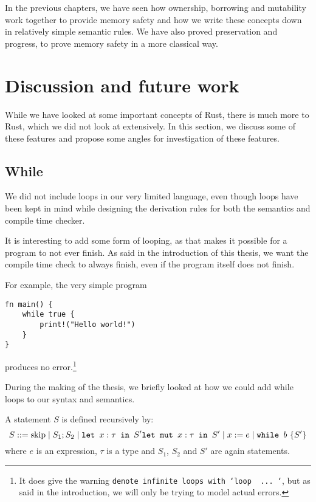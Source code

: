 In the previous chapters, we have seen how ownership, borrowing and mutability work together to provide memory safety and how we write these concepts down in relatively simple semantic rules. We have also proved preservation and progress, to prove memory safety in a more classical way. 

\section[discussion]{Discussion and future work}
While we have looked at some important concepts of Rust, there is much more to Rust, which we did not look at extensively. In this section, we discuss some of these features and propose some angles for investigation of these features.

\subsection{While}
We did not include loops in our very limited language, even though loops have been kept in mind while designing the derivation rules for both the semantics and compile time checker. 

It is interesting to add some form of looping, as that makes it possible for a program to not ever finish. As said in the introduction of this thesis, we want the compile time check to always finish, even if the program itself does not finish. 

For example, the very simple program 

\begin{verbatim}
fn main() {
    while true {
        print!("Hello world!")
    }
}
\end{verbatim}

produces no error.\footnote{It does give the warning \texttt{denote infinite loops with `loop { ... }`}, but as said in the introduction, we will only be trying to model actual errors.}

During the making of the thesis, we briefly looked at how we could add while loops to our syntax and semantics. 

\begin{definition}
\label{statementswhile}
A statement $S$ is defined recursively by:
$$S ::= \textrm{skip} \mid S_1; S_2 \mid \texttt{let }x : \tau \texttt{ in } S' \texttt{let mut }x : \tau \texttt{ in } S' \mid x := e \mid \texttt{while } b~ \{ S' \}$$
where $e$ is an expression, $\tau$ is a type and $S_1$, $S_2$ and $S'$ are again statements.
\end{definition}

